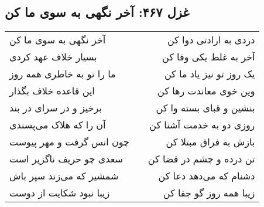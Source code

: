 \begin{center}
\section*{غزل ۴۶۷: آخر نگهی به سوی ما کن}
\label{sec:467}
\begin{longtable}{l p{0.5cm} r}
آخر نگهی به سوی ما کن
&&
دردی به ارادتی دوا کن
\\
بسیار خلاف عهد کردی
&&
آخر به غلط یکی وفا کن
\\
ما را تو به خاطری همه روز
&&
یک روز تو نیز یاد ما کن
\\
این قاعده خلاف بگذار
&&
وین خوی معاندت رها کن
\\
برخیز و در سرای در بند
&&
بنشین و قبای بسته وا کن
\\
آن را که هلاک می‌پسندی
&&
روزی دو به خدمت آشنا کن
\\
چون انس گرفت و مهر پیوست
&&
بازش به فراق مبتلا کن
\\
سعدی چو حریف ناگزیر است
&&
تن درده و چشم در قضا کن
\\
شمشیر که می‌زند سپر باش
&&
دشنام که می‌دهد دعا کن
\\
زیبا نبود شکایت از دوست
&&
زیبا همه روز گو جفا کن
\\
\end{longtable}
\end{center}
